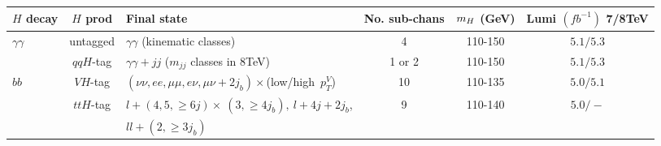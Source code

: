 \begin{table}
\centering
\begin{tabular}{|l|c|l|c|c|c|}
\hline
\textbf{$H$ decay} & \textbf{$H$ prod} & \textbf{Final state} 
& \textbf{No. sub-chans} & \textbf{$m_{H}$ (GeV)}
& \textbf{Lumi $(fb^{-1})$ 7/8TeV} \\
\hline
\hline
$\gamma\gamma$ 	 & untagged & $\gamma\gamma$ (kinematic classes) & 4 & 110-150 & $5.1/5.3$ \\
	& $qqH$-tag & $\gamma\gamma+jj$ ($m_{jj}$ classes in 8TeV) & 1 or 2  & 110-150 & $5.1/5.3$ \\
\hline
$bb$  & $VH$-tag & $(\nu\nu,ee,\mu\mu,e\nu,\mu\nu + 2 j_{b})\times$(low/high~$p_{T}^{V}$)
 & 10 & 110-135 & $5.0/5.1$ \\

 & $ttH$-tag & $l+(4,5,\ge6 j)\times~(3,\ge4 j_{b}),~l+4j +2j_{b}$,& 9 & 110-140 & $5.0/-$  \\
 &  	     &  $ll+(2,\ge3 j_{b})$ 				   & &   &  \\
\hline


\end{tabular}
\end{table}

